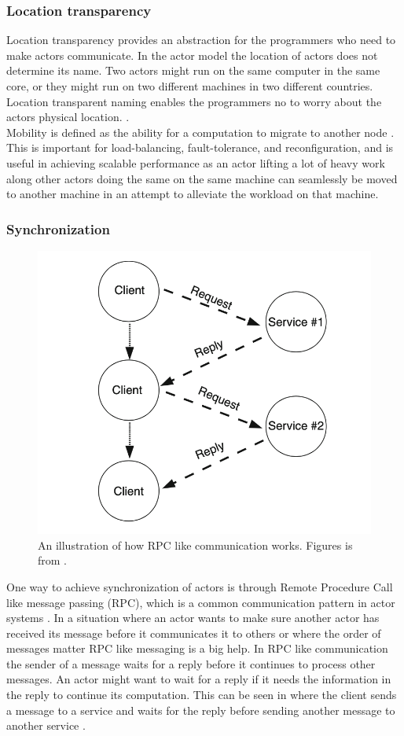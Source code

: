 \subsubsection{Location transparency}
Location transparency provides an abstraction for the programmers who need to make actors communicate. In the actor model the location of actors does not determine its name. Two actors might run on the same computer in the same core, or they might run on two different machines in two different countries. Location transparent naming enables the programmers no to worry about the actors physical location. \cite{ActorModelPaper}.\\
Mobility is defined as the ability for a computation to migrate to another node \cite{ActorModelPaper}. This is important for load-balancing, fault-tolerance, and reconfiguration, and is useful in achieving scalable performance \cite{ActorModelPaper} as an actor lifting a lot of heavy work along other actors doing the same on the same machine can seamlessly be moved to another machine in an attempt to alleviate the workload on that machine.

\subsubsection{Synchronization}
\begin{figure}[H]
	\centering
	\includegraphics[width=0.6\linewidth]{Materials/ActorModel/AMCommunication}
	\caption{An illustration of how RPC like communication works. Figures is from \cite{ActorModelPaper}.}
	\label{AMCommunication}
\end{figure}
One way to achieve synchronization of actors is through Remote Procedure Call like message passing (RPC), which is a common communication pattern in actor systems \cite{ActorModelPaper}. In a situation where an actor wants to make sure another actor has received its message before it communicates it to others or where the order of messages matter RPC like messaging is a big help. In RPC like communication the sender of a message waits for a reply before it continues to process other messages. An actor might want to wait for a reply if it needs the information in the reply to continue its computation. This can be seen in  where the client sends a message to a service and waits for the reply before sending another message to another service \cite{ActorModelPaper}.\\
